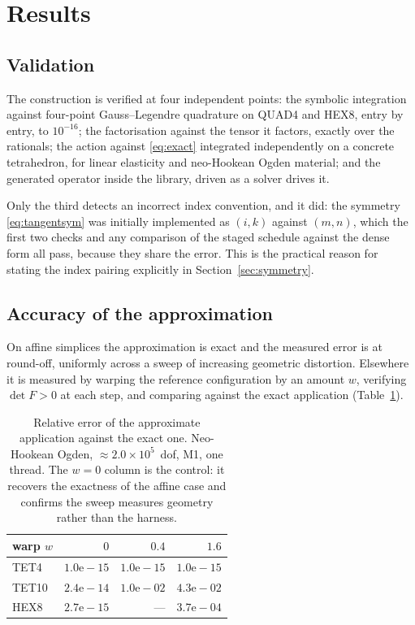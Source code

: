 \documentclass[11pt]{article}
\begin{document}
\section{Results}
\label{sec:results}

\subsection{Validation}

The construction is verified at four independent points: the symbolic
integration against four-point Gauss--Legendre quadrature on QUAD4 and HEX8,
entry by entry, to $10^{-16}$; the factorisation against the tensor it factors,
exactly over the rationals; the action against \eqref{eq:exact} integrated
independently on a concrete tetrahedron, for linear elasticity and neo-Hookean
Ogden material; and the generated operator inside the library, driven as a
solver drives it.

Only the third detects an incorrect index convention, and it did: the symmetry
\eqref{eq:tangentsym} was initially implemented as $(i,k)$ against $(m,n)$,
which the first two checks and any comparison of the staged schedule against the
dense form all pass, because they share the error.  This is the practical reason
for stating the index pairing explicitly in Section~\ref{sec:symmetry}.

\subsection{Accuracy of the approximation}
\label{sec:accuracy}

On affine simplices the approximation is exact and the measured error is at
round-off, uniformly across a sweep of increasing geometric distortion.
Elsewhere it is measured by warping the reference configuration by an amount
$w$, verifying $\det F > 0$ at each step, and comparing against the exact
application (Table~\ref{tab:warp}).

\begin{table}[ht]
\centering
\begin{tabular}{lrrr}
\toprule
warp $w$ & $0$ & $0.4$ & $1.6$ \\
\midrule
TET4  & $1.0\mathrm{e}{-}15$ & $1.0\mathrm{e}{-}15$ & $1.0\mathrm{e}{-}15$ \\
TET10 & $2.4\mathrm{e}{-}14$ & $1.0\mathrm{e}{-}02$ & $4.3\mathrm{e}{-}02$ \\
HEX8  & $2.7\mathrm{e}{-}15$ & ---                  & $3.7\mathrm{e}{-}04$ \\
\bottomrule
\end{tabular}
\caption{Relative error of the approximate application against the exact one.
Neo-Hookean Ogden, $\approx 2.0\times10^{5}$~dof, M1, one thread.  The $w=0$
column is the control: it recovers the exactness of the affine case and confirms
the sweep measures geometry rather than the harness.}
\label{tab:warp}
\end{table}
\end{document}
